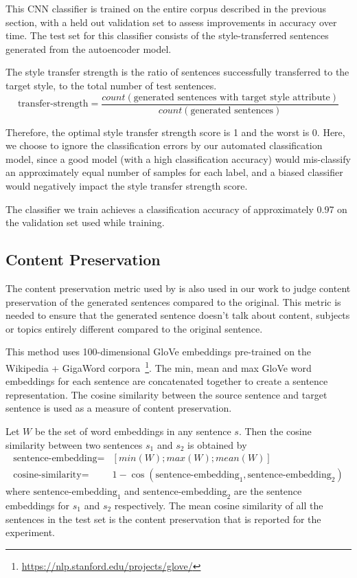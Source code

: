This CNN classifier is trained on the entire corpus described in the previous section, with a held out validation set to assess improvements in accuracy over time. The test set for this classifier consists of the style-transferred sentences generated from the autoencoder model.

The style transfer strength is the ratio of sentences successfully transferred to the target style, to the total number of test sentences.
\begin{equation*}
	\text{transfer-strength} = \frac{count(\text{generated sentences with target style attribute})}{count(\text{generated sentences})}
\end{equation*}

Therefore, the optimal style transfer strength score is 1 and the worst is 0. Here, we choose to ignore the classification errors by our automated classification model, since a good model (with a high classification accuracy) would mis-classify an approximately equal number of samples for each label, and a biased classifier would negatively impact the style transfer strength score.

The classifier we train achieves a classification accuracy of approximately 0.97 on the validation set used while training.

\subsection{Content Preservation} \label{ssec:content-preservation-metric}

The content preservation metric used by \cite{fu2017style} is also used in our work to judge content preservation of the generated sentences compared to the original. This metric is needed to ensure that the generated sentence doesn't talk about content, subjects or topics entirely different compared to the original sentence.

This method uses 100-dimensional GloVe embeddings \citep{pennington2014glove} pre-trained on the Wikipedia + GigaWord corpora~\footnote{\url{https://nlp.stanford.edu/projects/glove/}}. The min, mean and max GloVe word embeddings for each sentence are concatenated together to create a sentence representation. The cosine similarity between the source sentence and target sentence is used as a measure of content preservation.

Let $W$ be the set of word embeddings in any sentence $s$. Then the cosine similarity between two sentences $s_1$ and $s_2$ is obtained by
\begin{align*}
	\text{sentence-embedding} =
	 & [min(W);max(W);mean(W)]                                            \\
	\text{cosine-similarity} =
	 & 1 - \cos(\text{sentence-embedding}_1, \text{sentence-embedding}_2)
\end{align*}
where $\text{sentence-embedding}_1$ and $\text{sentence-embedding}_2$ are the sentence embeddings for $s_1$ and $s_2$ respectively. The mean cosine similarity of all the sentences in the test set is the content preservation that is reported for the experiment.

